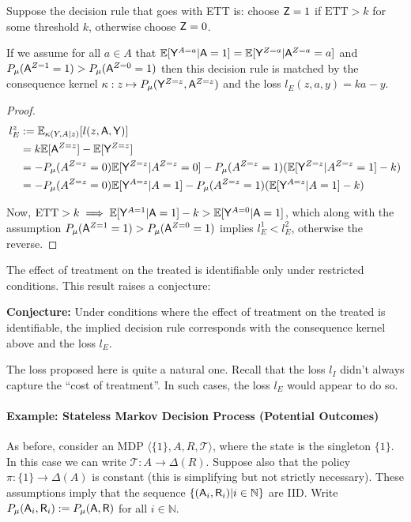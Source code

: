 Suppose the decision rule that goes with ETT is: choose $\mathsf{Z}=1$ if $\text{ETT}>k$ for some threshold $k$, otherwise choose $\mathsf{Z}=0$.

If we assume for all $a\in A$ that $\mathbb{E}[\mathsf{Y}^{A=a}|\mathsf{A}=1]=\mathbb{E}[\mathsf{Y}^{Z=a}|\mathsf{A}^{Z=a}=a]$ and $P_\mu(\mathsf{A}^{Z=1}=1)>P_\mu(\mathsf{A}^{Z=0}=1)$ then this decision rule is matched by the consequence kernel $\kappa:z\mapsto P_\mu(\mathsf{Y}^{Z=z},\mathsf{A}^{Z=z})$ and the loss $l_E(z,a,y)=ka-y$.

\begin{proof}
\begin{align}
    l^z_E &:= \mathbb{E}_{\kappa(Y,A|z)}[l(z,\mathsf{A},\mathsf{Y})] \\
    &= k\mathbb{E}[\mathsf{A}^{Z=z}] - \mathbb{E}[\mathsf{Y}^{Z=z}]\\
    &= - P_\mu(A^{Z=z}=0)\mathbb{E}[\mathsf{Y}^{Z=z}|A^{Z=z}=0] - P_\mu(A^{Z=z}=1)(\mathbb{E}[\mathsf{Y}^{Z=z}|A^{Z=z}=1]-k)\\
    &= - P_\mu(A^{Z=z}=0)\mathbb{E}[\mathsf{Y}^{A=z}|A=1] - P_\mu(A^{Z=z}=1)(\mathbb{E}[\mathsf{Y}^{A=z}|A=1]-k)
\end{align}

Now, $\text{ETT}>k\implies \mathbb{E}[\mathsf{Y}^{A=1}|\mathsf{A}=1]-k>\mathbb{E}[\mathsf{Y}^{A=0}|\mathsf{A}=1]$, which along with the assumption $P_\mu(\mathsf{A}^{Z=1}=1)>P_\mu(\mathsf{A}^{Z=0}=1)$ implies $l^1_E < l^2_E$, otherwise the reverse.
\end{proof}

The effect of treatment on the treated is identifiable only under restricted conditions\cite{angrist_identification_1996,shpitser_effects_2009}. This result raises a conjecture:

\textbf{Conjecture:} Under conditions where the effect of treatment on the treated is identifiable, the implied decision rule corresponds with the consequence kernel above and the loss $l_E$.

The loss proposed here is quite a natural one. Recall that the loss $l_I$ didn't always capture the ``cost of treatment''. In such cases, the loss $l_E$ would appear to do so.

\paragraph{Example: Stateless Markov Decision Process (Potential Outcomes)}\label{sec:smdp_po}

As before, consider an MDP $\langle \{1\},A,R,\mathcal{T}\rangle$, where the state is the singleton $\{1\}$. In this case we can write $\mathcal{T}:A\to \Delta(R)$. Suppose also that the policy $\pi:\{1\}\to \Delta(A)$ is constant (this is simplifying but not strictly necessary). These assumptions imply that the sequence $\{(\mathsf{A}_i,\mathsf{R}_i)|i\in \mathbb{N}\}$ are IID. Write $P_\mu(\mathsf{A}_i,\mathsf{R}_i):=P_\mu(\mathsf{A},\mathsf{R})$ for all $i\in \mathbb{N}$.

